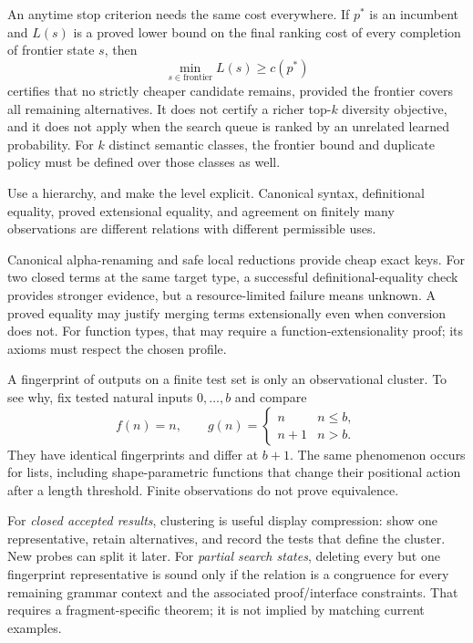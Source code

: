An anytime stop criterion needs the same cost everywhere. If $p^*$ is an incumbent and $L(s)$ is a proved lower bound on the final ranking cost of every completion of frontier state $s$, then
\[
  \min_{s\in\mathrm{frontier}}L(s)\geq c(p^*)
\]
certifies that no strictly cheaper candidate remains, provided the frontier covers all remaining alternatives. It does not certify a richer top-$k$ diversity objective, and it does not apply when the search queue is ranked by an unrelated learned probability. For $k$ distinct semantic classes, the frontier bound and duplicate policy must be defined over those classes as well.

\ans Use a hierarchy, and make the level explicit. Canonical syntax, definitional equality, proved extensional equality, and agreement on finitely many observations are different relations with different permissible uses.

Canonical alpha-renaming and safe local reductions provide cheap exact keys. For two closed terms at the same target type, a successful definitional-equality check provides stronger evidence, but a resource-limited failure means unknown. A proved equality may justify merging terms extensionally even when conversion does not. For function types, that may require a function-extensionality proof; its axioms must respect the chosen profile.

A fingerprint of outputs on a finite test set is only an observational cluster. To see why, fix tested natural inputs $0,\ldots,b$ and compare
\[
 f(n)=n,\qquad
 g(n)=\begin{cases}n&n\leq b,\\n+1&n>b.\end{cases}
\]
They have identical fingerprints and differ at $b+1$. The same phenomenon occurs for lists, including shape-parametric functions that change their positional action after a length threshold. Finite observations do not prove equivalence.

For \emph{closed accepted results}, clustering is useful display compression: show one representative, retain alternatives, and record the tests that define the cluster. New probes can split it later. For \emph{partial search states}, deleting every but one fingerprint representative is sound only if the relation is a congruence for every remaining grammar context and the associated proof/interface constraints. That requires a fragment-specific theorem; it is not implied by matching current examples.


